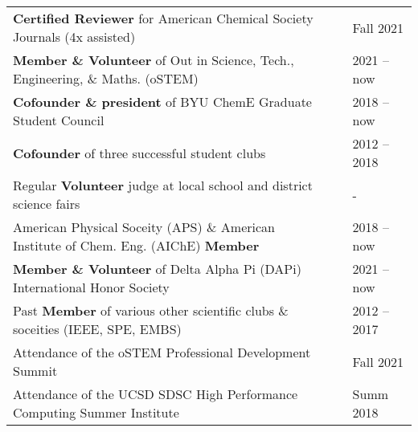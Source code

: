 \documentclass[letterpaper,11pt]{article}
\begin{document}
\begin{tabular}{@{}p{} p{} l@{}}
  \textbf{Certified Reviewer} for American Chemical Society Journals (4x assisted)                         & & Fall 2021 \\[4pt]
  \textbf{Member \& Volunteer} of Out in Science, Tech., Engineering, \& Maths. (oSTEM)                    & & 2021 -- now \\[4pt]
  \textbf{Cofounder \& president} of BYU ChemE Graduate Student Council                                    & & 2018 -- now \\[4pt]
  \textbf{Cofounder} of three successful student clubs                                                     & & 2012 -- 2018 \\[4pt]
  Regular \textbf{Volunteer} judge at local school and district science fairs                              & & - \\[4pt]
  American Physical Soceity (APS) \& American Institute of Chem. Eng. (AIChE) \textbf{Member}              & & 2018 -- now \\[4pt]
  \textbf{Member \& Volunteer} of Delta Alpha Pi (DAPi) International Honor Society                                 & & 2021 -- now \\[4pt]
  Past \textbf{Member} of various other scientific clubs \& soceities (IEEE, SPE, EMBS)                    & & 2012 -- 2017 \\[4pt]
  Attendance of the oSTEM Professional Development Summit                                                  & & Fall 2021 \\[4pt]
  Attendance of the UCSD SDSC High Performance Computing Summer Institute                                  & & Summ 2018 \\[4pt]
\end{tabular}
\end{document}
